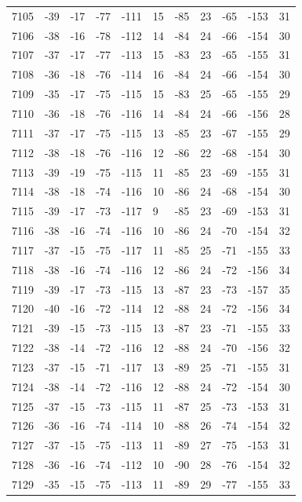 \begin{table}[H]
\begin{tabular}{lllllllllll}
7105 & -39 & -17 & -77 & -111 & 15 & -85 & 23 & -65 & -153 & 31 \\
7106 & -38 & -16 & -78 & -112 & 14 & -84 & 24 & -66 & -154 & 30 \\
7107 & -37 & -17 & -77 & -113 & 15 & -83 & 23 & -65 & -155 & 31 \\
7108 & -36 & -18 & -76 & -114 & 16 & -84 & 24 & -66 & -154 & 30 \\
7109 & -35 & -17 & -75 & -115 & 15 & -83 & 25 & -65 & -155 & 29 \\
7110 & -36 & -18 & -76 & -116 & 14 & -84 & 24 & -66 & -156 & 28 \\
7111 & -37 & -17 & -75 & -115 & 13 & -85 & 23 & -67 & -155 & 29 \\
7112 & -38 & -18 & -76 & -116 & 12 & -86 & 22 & -68 & -154 & 30 \\
7113 & -39 & -19 & -75 & -115 & 11 & -85 & 23 & -69 & -155 & 31 \\
7114 & -38 & -18 & -74 & -116 & 10 & -86 & 24 & -68 & -154 & 30 \\
7115 & -39 & -17 & -73 & -117 & 9 & -85 & 23 & -69 & -153 & 31 \\
7116 & -38 & -16 & -74 & -116 & 10 & -86 & 24 & -70 & -154 & 32 \\
7117 & -37 & -15 & -75 & -117 & 11 & -85 & 25 & -71 & -155 & 33 \\
7118 & -38 & -16 & -74 & -116 & 12 & -86 & 24 & -72 & -156 & 34 \\
7119 & -39 & -17 & -73 & -115 & 13 & -87 & 23 & -73 & -157 & 35 \\
7120 & -40 & -16 & -72 & -114 & 12 & -88 & 24 & -72 & -156 & 34 \\
7121 & -39 & -15 & -73 & -115 & 13 & -87 & 23 & -71 & -155 & 33 \\
7122 & -38 & -14 & -72 & -116 & 12 & -88 & 24 & -70 & -156 & 32 \\
7123 & -37 & -15 & -71 & -117 & 13 & -89 & 25 & -71 & -155 & 31 \\
7124 & -38 & -14 & -72 & -116 & 12 & -88 & 24 & -72 & -154 & 30 \\
7125 & -37 & -15 & -73 & -115 & 11 & -87 & 25 & -73 & -153 & 31 \\
7126 & -36 & -16 & -74 & -114 & 10 & -88 & 26 & -74 & -154 & 32 \\
7127 & -37 & -15 & -75 & -113 & 11 & -89 & 27 & -75 & -153 & 31 \\
7128 & -36 & -16 & -74 & -112 & 10 & -90 & 28 & -76 & -154 & 32 \\
7129 & -35 & -15 & -75 & -113 & 11 & -89 & 29 & -77 & -155 & 33 \\

\end{tabular}
\end{table}
